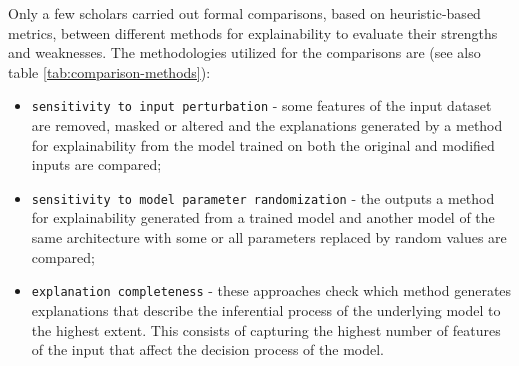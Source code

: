 \documentclass[final,1p,times]{elsarticle}
\begin{document}
Only a few scholars carried out formal comparisons, based on heuristic-based metrics, between different methods for explainability to evaluate their strengths and weaknesses. The methodologies utilized for the comparisons are (see also table \ref{tab:comparison-methods}):
\begin{itemize}
\item {\verb|sensitivity to input perturbation|} - some features of the input dataset are removed, masked or altered and the explanations generated by a method for explainability from the model trained on both the original and modified inputs are compared; 
\item {\verb|sensitivity to model parameter randomization|} - the outputs a method for explainability generated from a trained model and another model of the same architecture with some or all parameters replaced by random values are compared;
\item {\verb|explanation completeness|} - these approaches check which method generates explanations that describe the inferential process of the underlying model to the highest extent. This consists of capturing the highest number of features of the input that affect the decision process of the model.
\end{itemize}
\end{document}

